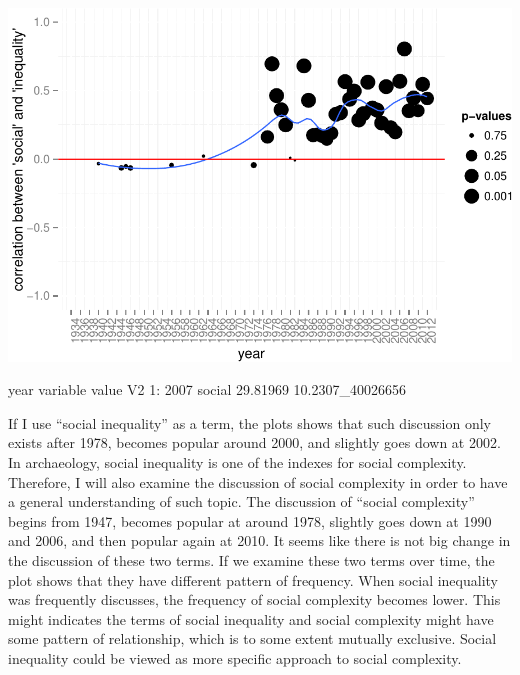 \documentclass[10pt]{article}
\newenvironment{CodeChunk}{}{}
\begin{document}
\begin{CodeChunk}
\includegraphics{509Assignment_files/figure-latex/onegram-3} \begin{CodeOutput}
   year variable    value               V2
1: 2007   social 29.81969 10.2307_40026656
\end{CodeOutput}
\end{CodeChunk}

If I use ``social inequality'' as a term, the plots shows that such
discussion only exists after 1978, becomes popular around 2000, and
slightly goes down at 2002. In archaeology, social inequality is one of
the indexes for social complexity. Therefore, I will also examine the
discussion of social complexity in order to have a general understanding
of such topic. The discussion of ``social complexity'' begins from 1947,
becomes popular at around 1978, slightly goes down at 1990 and 2006, and
then popular again at 2010. It seems like there is not big change in the
discussion of these two terms. If we examine these two terms over time,
the plot shows that they have different pattern of frequency. When
social inequality was frequently discusses, the frequency of social
complexity becomes lower. This might indicates the terms of social
inequality and social complexity might have some pattern of
relationship, which is to some extent mutually exclusive. Social
inequality could be viewed as more specific approach to social
complexity.
\end{document}
